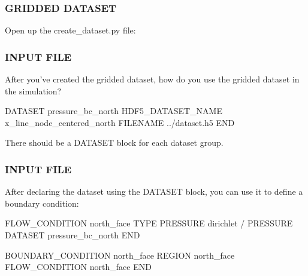 \documentclass{beamer}
\begin{document}
\begin{frame}\frametitle{GRIDDED DATASET}

Open up the create\_dataset.py file:

\end{frame}

\begin{frame}\frametitle{INPUT FILE}

After you've created the gridded dataset,
how do you use the gridded dataset in the simulation? 

\begin{semiverbatim}
DATASET pressure_bc_north
  HDF5_DATASET_NAME x_line_node_centered_north
  FILENAME ../dataset.h5
END
\end{semiverbatim}

There should be a DATASET block for each dataset group.

\end{frame}

\begin{frame}\frametitle{INPUT FILE}

After declaring the dataset using the DATASET block, you can use it to
define a boundary condition:

\begin{semiverbatim}
FLOW_CONDITION north_face
  TYPE
    PRESSURE dirichlet
  /
  PRESSURE DATASET pressure_bc_north
END

BOUNDARY_CONDITION north_face
  REGION north_face
  FLOW_CONDITION north_face
END
\end{semiverbatim}


\end{frame}
\end{document}

